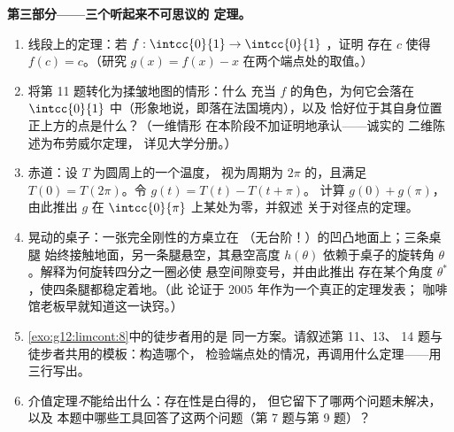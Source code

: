 \begin{problem}
\medskip
\noindent\textbf{第三部分——三个听起来不可思议的
定理。}
\begin{enumerate}[resume]
  \item 线段上的定理：若
        $f : \intcc{0}{1} \to \intcc{0}{1}$ ，证明
        存在 $c$ 使得 $f(c) = c$。（研究
        $g(x) = f(x) - x$ 在两个端点处的取值。）
  \item 将第 11 题转化为揉皱地图的情形：什么
        充当 $f$ 的角色，为何它会落在
        $\intcc{0}{1}$ 中（形象地说，即落在法国境内），以及
        恰好位于其自身位置正上方的点是什么？（一维情形
        在本阶段不加证明地承认——诚实的
        二维陈述为布劳威尔定理，
        详见大学分册。）
  \item 赤道：设 $T$ 为圆周上的一个温度，
        视为周期为 $2\pi$ 的，且满足
        $T(0) = T(2\pi)$。令 $g(t) = T(t) - T(t + \pi)$。
        计算 $g(0) + g(\pi)$，由此推出 $g$
        在 $\intcc{0}{\pi}$ 上某处为零，并叙述
        关于对径点的定理。
  \item 晃动的桌子：一张完全刚性的方桌立在
        （无台阶！）的凹凸地面上；三条桌腿
        始终接触地面，另一条腿悬空，其悬空高度 $h(\theta)$
        依赖于桌子的旋转角
        $\theta$。解释为何旋转四分之一圈必使
        悬空间隙变号，并由此推出
        存在某个角度 $\theta^*$，使四条腿都稳定着地。（此
        论证于 2005 年作为一个真正的定理发表；
        咖啡馆老板早就知道这一诀窍。）
  \item \cref{exo:g12:limcont:8}中的徒步者用的是
        同一方案。请叙述第 11、13、
        14 题与徒步者共用的模板：构造哪个，
        检验端点处的情况，再调用什么定理——用三行写出。
  \item 介值定理\emph{不}能给出什么：存在性是白得的，
        但它留下了哪两个问题未解决，以及
        本题中哪些工具回答了这两个问题（第 7 题与第 9 题）？
\end{enumerate}


\end{problem}
